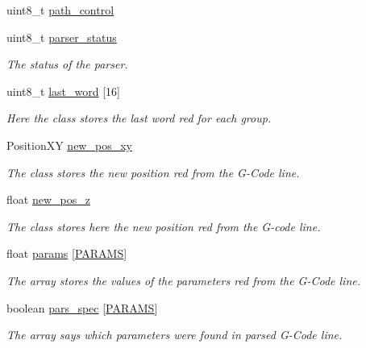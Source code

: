 \begin{DoxyCompactItemize}
\item 
uint8\+\_\+t \hyperlink{class_g_code_a05307dd7b9ff2f74bfd81aed40104fa8}{path\+\_\+control}
\item 
uint8\+\_\+t \hyperlink{class_g_code_a56d0e5e56115cd8e7b3f161cc8c0528e}{parser\+\_\+status}
\begin{DoxyCompactList}\small\item\em The status of the parser. \end{DoxyCompactList}\item 
uint8\+\_\+t \hyperlink{class_g_code_a3674417ee3c5141c6655c05f6ffa0799}{last\+\_\+word} \mbox{[}16\mbox{]}
\begin{DoxyCompactList}\small\item\em Here the class stores the last word red for each group. \end{DoxyCompactList}\item 
Position\+X\+Y \hyperlink{class_g_code_a996f87623f8a0263c3a7761060330de0}{new\+\_\+pos\+\_\+xy}
\begin{DoxyCompactList}\small\item\em The class stores the new position red from the G-\/\+Code line. \end{DoxyCompactList}\item 
float \hyperlink{class_g_code_acd3b6b2ecfc46bff229fbfd7ba72930f}{new\+\_\+pos\+\_\+z}
\begin{DoxyCompactList}\small\item\em The class stores here the new position red from the G-\/code line. \end{DoxyCompactList}\item 
float \hyperlink{class_g_code_a6f38c9dddbd7c12c786c6363fd2a369c}{params} \mbox{[}\hyperlink{_g_code__def_8h_ab0b1e59d96396ba9dca2147f9feb44eb}{P\+A\+R\+A\+M\+S}\mbox{]}
\begin{DoxyCompactList}\small\item\em The array stores the values of the parameters red from the G-\/\+Code line. \end{DoxyCompactList}\item 
boolean \hyperlink{class_g_code_a6d11b02685ef1b387a3c9da004547006}{pars\+\_\+spec} \mbox{[}\hyperlink{_g_code__def_8h_ab0b1e59d96396ba9dca2147f9feb44eb}{P\+A\+R\+A\+M\+S}\mbox{]}
\begin{DoxyCompactList}\small\item\em The array says which parameters were found in parsed G-\/\+Code line. \end{DoxyCompactList}\item 

\end{DoxyCompactItemize}
